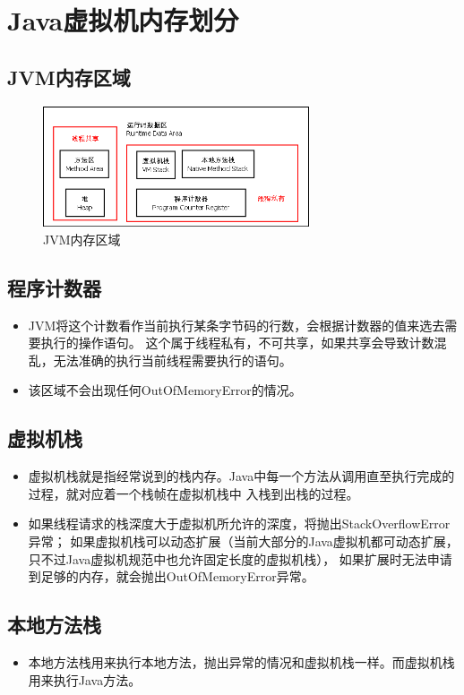 \section{Java虚拟机内存划分}
\subsection{JVM内存区域}
\begin{figure}[!h]
	\centering
	\includegraphics[width=0.7\textwidth]{image/JVM-Merory.png}
	\caption{JVM内存区域}
\end{figure}
\subsection{程序计数器}
\begin{itemize}
	\item JVM将这个计数看作当前执行某条字节码的行数，会根据计数器的值来选去需要执行的操作语句。
	这个属于线程私有，不可共享，如果共享会导致计数混乱，无法准确的执行当前线程需要执行的语句。
	\item 该区域不会出现任何OutOfMemoryError的情况。
\end{itemize}
\subsection{虚拟机栈}
\begin{itemize}
	\item 虚拟机栈就是指经常说到的栈内存。Java中每一个方法从调用直至执行完成的过程，就对应着一个栈帧在虚拟机栈中
	入栈到出栈的过程。
	\item 如果线程请求的栈深度大于虚拟机所允许的深度，将抛出StackOverflowError异常；
	如果虚拟机栈可以动态扩展（当前大部分的Java虚拟机都可动态扩展，只不过Java虚拟机规范中也允许固定长度的虚拟机栈），
	如果扩展时无法申请到足够的内存，就会抛出OutOfMemoryError异常。
\end{itemize}
\subsection{本地方法栈}
\begin{itemize}
	\item 本地方法栈用来执行本地方法，抛出异常的情况和虚拟机栈一样。而虚拟机栈用来执行Java方法。
\end{itemize}
